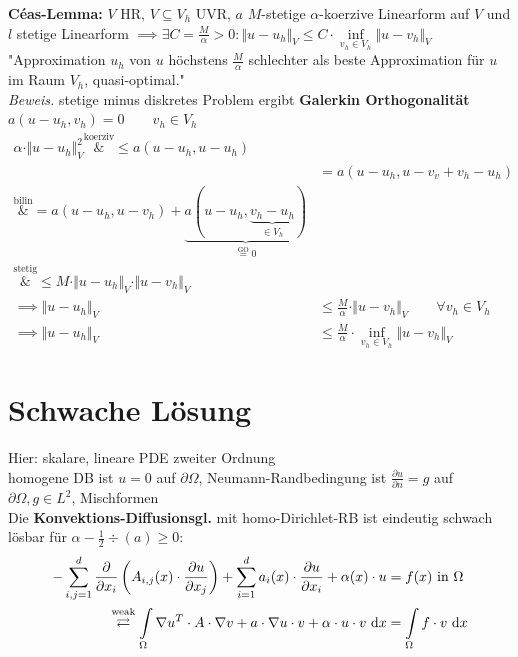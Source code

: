 \documentclass[12pt]{scrartcl}
\begin{document}
	\textbf{Céas-Lemma:} $V$ HR, $V\subseteq V_h$ UVR, $a$ $M$-stetige $\alpha$-koerzive Linearform auf $V$ und $l$ stetige Linearform $\implies\exists C=\frac{M}{\alpha}>0:\Vert u-u_h\Vert_V\leq C\cdot\inf\limits_{v_h\in V_h}\Vert u-v_h\Vert_V$
	"Approximation $u_h$ von $u$ höchstens $\frac{M}{\alpha}$ schlechter als beste Approximation für $u$ im Raum $V_h$, quasi-optimal."\\
	\textit{Beweis.} stetige minus diskretes Problem ergibt \textbf{Galerkin Orthogonalität} 
	$a(u-u_h,v_h)=0\qquad v_h\in V_h$
	\begin{align*}
		\alpha\cdot\Vert u-u_h\Vert^2_V
		\overset{\text{koerziv}}&\leq
		a(u-u_h,u-u_h)\\
		&=a(u-u_h,u-v_v+v_h- u_h)\\
		\overset{\text{bilin}}&=
		a(u-u_h,u-v_h)+\underbrace{a(u-u_h,\underbrace{v_h-u_h}_{\in V_h})}_{\overset{\text{GO}}=0}\\
		\overset{\text{stetig}}&{\leq}
		M\cdot\Vert u-u_h\Vert_V\cdot\Vert u-v_h\Vert_V\\
		\implies
		\Vert u-u_h\Vert_V&\leq\frac{M}{\alpha}\cdot\Vert u-v_h\Vert_V\qquad\forall v_h\in V_h\\
		\implies
		\Vert u-u_h\Vert_V&\leq \frac{M}{\alpha}\cdot\inf\limits_{v_h\in V_h}\Vert u-v_h\Vert_V
	\end{align*}
	
	\section{Schwache Lösung}
	
	Hier: skalare, lineare PDE zweiter Ordnung\\
	homogene DB ist $u=0$ auf $\partial\Omega$, Neumann-Randbedingung ist $\frac{\partial u}{\partial n}=g$ auf $\partial\Omega,g\in L^2$, Mischformen\\
	Die \textbf{Konvektions-Diffusionsgl.} mit homo-Dirichlet-RB ist eindeutig schwach lösbar für $\alpha-\frac{1}{2}\div(a)\geq0$:
	\begin{align*}
	-\sum\limits_{i,j=1}^d\frac{\partial}{\partial x_i}\left(A_{i,j}(x)\cdot\frac{\partial u}{\partial x_j}\right)+\sum\limits_{i=1}^d a_i(x)\cdot\frac{\partial u}{\partial x_i}+\alpha(x)\cdot u&=f(x)\text{ in }\Omega\\
	\overset{\text{weak}}{\rightleftarrows}
	\int\limits_\Omega\nabla u^T\cdot A\cdot\nabla v+a\cdot\nabla u\cdot v+\alpha\cdot u\cdot v\text{ d} x&=\int\limits_\Omega f\cdot v\text{ d} x
	\end{align*}
	
\end{document}
